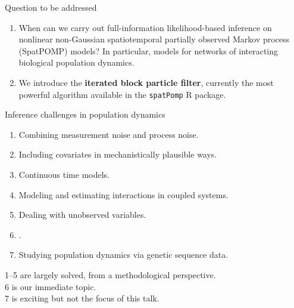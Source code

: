 \documentclass{beamer}
\begin{document}
\begin{frame}{Question to be addressed}

  \begin{enumerate}
  \item When can we carry out full-information likelihood-based inference on nonlinear non-Gaussian spatiotemporal partially observed Markov process (SpatPOMP) models? In particular, models for networks of interacting biological population dynamics.

        \vspace{2mm}

\item We introduce the {\bf iterated block particle filter}, currently the most powerful algorithm available in the \texttt{spatPomp} R package.


  
    \end{enumerate}
\end{frame}

\newcommand\challengeSep{\vspace{3mm}}

\begin{frame}{Inference challenges in population dynamics}

  \begin{enumerate}
\item Combining measurement noise and process noise.
\item Including covariates in mechanistically plausible ways.
\item  Continuous time models.
\item  Modeling and estimating interactions in coupled systems.
\item  Dealing with unobserved variables.
\item  {}.
\item  Studying population dynamics via genetic sequence data.
  \end{enumerate}

  \vspace{4mm}
  
  1--5 are largely solved, from a methodological perspective.\\
  6 is our immediate topic.\\
  7 is exciting but not the focus of this talk.


  \vspace{4mm}

  
\end{frame}
\end{document}
